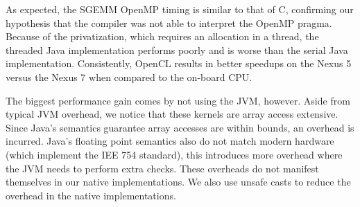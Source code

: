 As expected, the SGEMM OpenMP timing is similar to that of C, confirming our hypothesis that the compiler was not able
  to interpret the OpenMP pragma.
Because of the privatization, which requires an allocation in a thread, the threaded Java implementation performs poorly and is 
  worse than the serial Java implementation.
Consistently, OpenCL results in better speedups on the Nexus 5 versus the Nexus 7 when compared to the on-board CPU. 

The biggest performance gain comes by not using the JVM, however.
Aside from typical JVM overhead, we notice that these kernels are array access extensive.
Since Java's semantics guarantee array accesses are within bounds, an overhead is incurred.
Java's floating point semantics also do not match modern hardware (which implement the IEE 754 standard),
  this introduces more overhead where the JVM needs to perform extra checks.
These overheads do not manifest themselves in our native implementations.
We also use unsafe casts to reduce the overhead in the native implementations.

